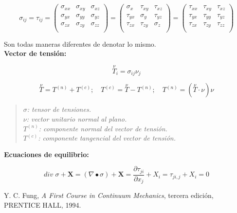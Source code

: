 \documentclass[a4paper,12pt,twoside,final,spanish]{article}
\begin{document}
\[
\sigma_{ij}=\tau_{ij}=
\left(\begin{matrix}
\sigma_{xx} & \sigma_{xy} & \sigma_{xz}\\
\sigma_{yx} & \sigma_{yy} & \sigma_{yz}\\
\sigma_{zx} & \sigma_{zy} & \sigma_{zz}\\
\end{matrix}\right)=
\left(\begin{matrix}
\sigma_{x} & \tau_{xy} & \tau_{xz}\\
\tau_{yx} & \sigma_{y} & \tau_{yz}\\
\tau_{zx} & \tau_{zy} & \sigma_{z}\\
\end{matrix}\right)=
\left(\begin{matrix}
\tau_{xx} & \tau_{xy} & \tau_{xz}\\
\tau_{yx} & \tau_{yy} & \tau_{yz}\\
\tau_{zx} & \tau_{zy} & \tau_{zz}\\
\end{matrix}\right)
\]

Son todas maneras diferentes de denotar lo mismo.\\

\textbf{Vector de tensión:}

\[
\stackrel \nu T_{i}=\sigma_{ij}\nu_{j}
\]

\[
\stackrel \nu T=T^{(n)}+T^{(c)};\quad T^{(c)}=\stackrel \nu T-T^{(n)};\quad T^{(n)}=(\stackrel \nu T\cdot\nu)\nu
\]

\begin{quote}
\textit{$\sigma$: tensor de tensiones.}\\
\textit{$\nu$: vector unitario normal al plano.}\\
\textit{$T^{(n)}$: componente normal del vector de tensión.}\\
\textit{$T^{(c)}$: componente tangencial del vector de tensión.}
\end{quote}

\textbf{Ecuaciones de equilibrio:}

\[
\textit{div }\sigma+\mathbf{X}=(\nabla\bullet\sigma)+\mathbf{X}=\frac{\partial\tau_{ji}}{\partial x_{j}}+X_{i}=
\tau_{ji,j}+X_{i}=0
\]

\begin{thebibliography}{1}
Y. C. Fung,
\emph{A First Course in Continuum Mechanics}, 
tercera edición,
PRENTICE HALL,
1994.
\end{thebibliography}
\end{document}
